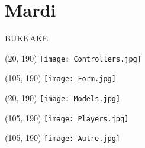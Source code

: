 \chapter{Mardi}

BUKKAKE \\

\begin{textblock}{0}(20, 190)
	\texttt{[image: Controllers.jpg]}
\end{textblock}

\begin{textblock}{0}(105, 190)
	\texttt{[image: Form.jpg]}
\end{textblock}

\begin{textblock}{0}(20, 190)
	\texttt{[image: Models.jpg]}
\end{textblock}

\begin{textblock}{0}(105, 190)
	\texttt{[image: Players.jpg]}
\end{textblock}

\begin{textblock}{0}(105, 190)
	\texttt{[image: Autre.jpg]}
\end{textblock}
